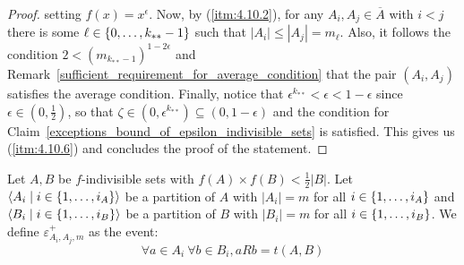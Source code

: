 \begin{lemma}[Claim 4.10]
\begin{proof}
            setting $f(x) = x^\epsilon$.
            Now, by (\ref{itm:4.10.2}), for any $A_i, A_j \in \overline{A}$ with $i < j$
            there is some $\ell \in \left\{ 0, \dots, k_{**}-1 \right\}$ such that $|A_i| \leq |A_j| = m_\ell$.
            Also, it follows the condition $2 < (m_{k_{**}-1})^{1-2\epsilon}$ and Remark~\ref{sufficient_requirement_for_average_condition}
            that the pair $(A_i,A_j)$ satisfies the average condition.
            Finally, notice that $\epsilon^{k_{**}} < \epsilon < 1 - \epsilon$ since $\epsilon \in (0, \frac{1}{2})$,
            so that $\zeta \in (0, \epsilon ^ {k_{**}}) \subseteq (0, 1 - \epsilon)$ and the condition for
            Claim~\ref{exceptions_bound_of_epsilon_indivisible_sets} is satisfied.
            This gives us (\ref{itm:4.10.6}) and concludes the proof of the statement.
        \end{proof}
    \end{lemma}


    \begin{definition}
        Let $A, B$ be $f$-indivisible sets with $f(A) \times f(B) < \frac{1}{2} |B|$.
        Let $\left< A_i \mid i \in \left\{ 1, \dots, i_A \right\} \right>$ be a partition of $A$ with $|A_i| = m$ for all
        $i \in \left\{ 1, \dots, i_A \right\}$ and $\left< B_i \mid i \in \left\{ 1, \dots, i_B \right\} \right>$ be a partition of
        $B$ with $|B_i| = m$ for all $i \in \left\{ 1, \dots, i_B \right\}$.
        We define $\varepsilon^+_{A_i,A_j,m}$ as the event:
        \[
            \forall a \in A_i \ \forall b \in B_i, a R b = t(A,B)
        \]
    \end{definition}

